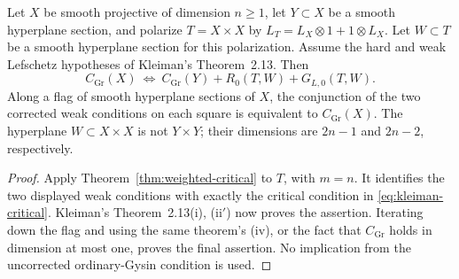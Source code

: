 \begin{corollary}
\label{cor:corrected-scan050}
Let $X$ be smooth projective of dimension $n\ge1$, let $Y\subset X$
be a smooth hyperplane section, and polarize $T=X\times X$ by
$L_T=L_X\otimes1+1\otimes L_X$.  Let $W\subset T$ be a smooth
hyperplane section for this polarization.  Assume the hard and weak
Lefschetz hypotheses of Kleiman's Theorem~2.13.  Then
\begin{equation}
 \boxed{\quad C_{\mathrm{Gr}}(X)\ \Longleftrightarrow\
 C_{\mathrm{Gr}}(Y)+R_0(T,W)+G_{L,0}(T,W).\quad}
 \label{eq:corrected-scan050}
\end{equation}
Along a flag of smooth hyperplane sections of $X$, the conjunction
of the two corrected weak conditions on each square is equivalent
to $C_{\mathrm{Gr}}(X)$.  The hyperplane $W\subset X\times X$
is not $Y\times Y$; their dimensions are $2n-1$ and $2n-2$,
respectively.
\end{corollary}
\begin{proof}
Apply Theorem~\ref{thm:weighted-critical} to $T$, with $m=n$.
It identifies the two displayed weak conditions with exactly the
critical condition in \eqref{eq:kleiman-critical}.  Kleiman's
Theorem~2.13(i), (ii$'$) now proves the assertion.  Iterating down
the flag and using the same theorem's (iv), or the fact that
$C_{\mathrm{Gr}}$ holds in dimension at most one, proves the final
assertion.  No implication from the uncorrected ordinary-Gysin
condition is used.
\end{proof}

